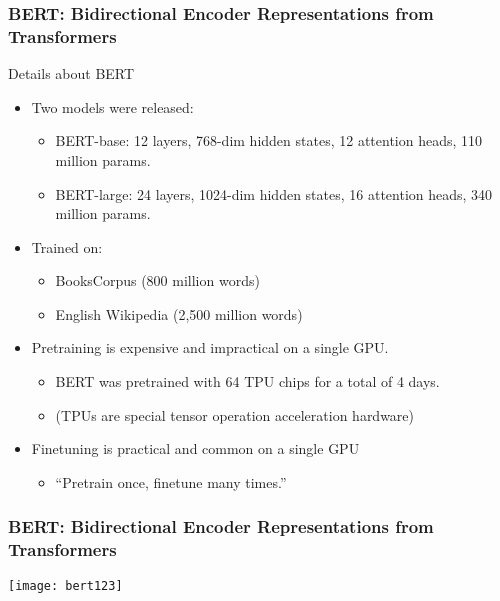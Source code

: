 \begin{frame}[fragile]\frametitle{BERT: Bidirectional Encoder Representations from Transformers}

Details about BERT


      \begin{itemize}
			\item Two models were released:
			      \begin{itemize}
						\item BERT-base: 12 layers, 768-dim hidden states, 12 attention heads, 110 million params.
						\item BERT-large: 24 layers, 1024-dim hidden states, 16 attention heads, 340 million params.
						\end{itemize}

			\item Trained on:
			      \begin{itemize}
						\item BooksCorpus (800 million words)
						\item English Wikipedia (2,500 million words)
						\end{itemize}

			\item Pretraining is expensive and impractical on a single GPU.
			      \begin{itemize}
						\item BERT was pretrained with 64 TPU chips for a total of 4 days.
						\item (TPUs are special tensor operation acceleration hardware)
						\end{itemize}

			\item Finetuning is practical and common on a single GPU
			      \begin{itemize}
						\item ``Pretrain once, finetune many times.''
						\end{itemize}

			\end{itemize}
			

\end{frame}

\begin{frame}[fragile]\frametitle{BERT: Bidirectional Encoder Representations from Transformers}

			\begin{center}
			\texttt{[image: bert123]}
			\end{center}		
			

\end{frame}

